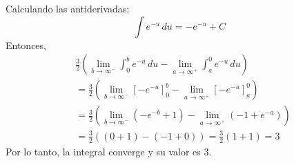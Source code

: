 \begin{multicols}{2}
\begin{enumerate}
    Calculando las antiderivadas:
    \[
      \int e^{-u} \, du = -e^{-u} + C
    \]
    Entonces,
    \[
      \begin{aligned}
        &\frac{3}{2}\left(\lim_{b \to \infty^{-}} \int_{0}^{b} e^{-u} \, du - \lim_{a \to \infty^{+}} \int_{a}^{0} e^{-u} \, du\right) \\
        &= \frac{3}{2}\left(\lim_{b \to \infty^{-}} \left[-e^{-u}\right]_{0}^{b} - \lim_{a \to \infty^{+}} \left[-e^{-u}\right]_{a}^{0}\right) \\
        &= \frac{3}{2}\left(\lim_{b \to \infty^{-}} (-e^{-b} + 1) - \lim_{a \to \infty^{+}} (-1 + e^{-a})\right) \\
        &= \frac{3}{2}\left((0 + 1) - (-1 + 0)\right) = \frac{3}{2}(1 + 1) = 3
      \end{aligned}
    \]
    Por lo tanto, la integral converge y su valor es \( 3 \).
\end{enumerate}

\end{multicols}
